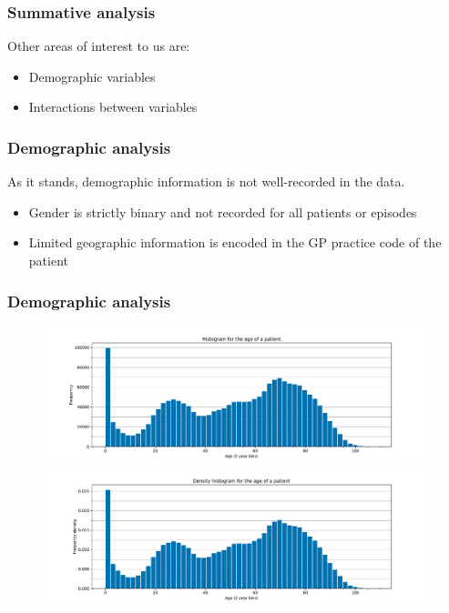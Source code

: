\documentclass{beamer}
\begin{document}
\begin{frame}
    \frametitle{Summative analysis}

    Other areas of interest to us are:
    \begin{itemize}
        \item Demographic variables
        \item Interactions between variables
    \end{itemize}
\end{frame}

\begin{frame}
    \frametitle{Demographic analysis}

    As it stands, demographic information is not well-recorded in the data.

    \vspace{10pt}
    \begin{itemize}
        \pause%
        \item Gender is strictly binary and not recorded for all patients or
            episodes
        \pause%
        \item Limited geographic information is encoded in the GP practice code
            of the patient
    \end{itemize}
\end{frame}

\begin{frame}
    \frametitle{Demographic analysis}

    \begin{figure}
        \begin{minipage}{\linewidth}
        \includegraphics[width=\linewidth]{./img/age_freq_hist.pdf}
        \end{minipage}
        \begin{minipage}{\linewidth}
        \includegraphics[width=\linewidth]{./img/age_density_hist.pdf}
        \end{minipage}
    \end{figure}
\end{frame}
\end{document}
